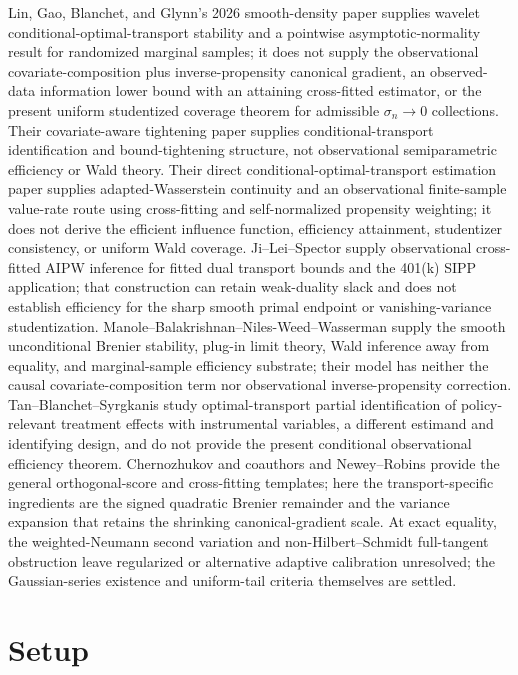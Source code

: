 \documentclass{article}
\begin{document}
Lin, Gao, Blanchet, and Glynn's 2026 smooth-density paper supplies wavelet conditional-optimal-transport stability and a pointwise asymptotic-normality result for randomized marginal samples; it does not supply the observational covariate-composition plus inverse-propensity canonical gradient, an observed-data information lower bound with an attaining cross-fitted estimator, or the present uniform studentized coverage theorem for admissible \(\sigma_n\to0\) collections. Their covariate-aware tightening paper supplies conditional-transport identification and bound-tightening structure, not observational semiparametric efficiency or Wald theory. Their direct conditional-optimal-transport estimation paper supplies adapted-Wasserstein continuity and an observational finite-sample value-rate route using cross-fitting and self-normalized propensity weighting; it does not derive the efficient influence function, efficiency attainment, studentizer consistency, or uniform Wald coverage. Ji--Lei--Spector supply observational cross-fitted AIPW inference for fitted dual transport bounds and the 401(k) SIPP application; that construction can retain weak-duality slack and does not establish efficiency for the sharp smooth primal endpoint or vanishing-variance studentization. Manole--Balakrishnan--Niles-Weed--Wasserman supply the smooth unconditional Brenier stability, plug-in limit theory, Wald inference away from equality, and marginal-sample efficiency substrate; their model has neither the causal covariate-composition term nor observational inverse-propensity correction. Tan--Blanchet--Syrgkanis study optimal-transport partial identification of policy-relevant treatment effects with instrumental variables, a different estimand and identifying design, and do not provide the present conditional observational efficiency theorem. Chernozhukov and coauthors and Newey--Robins provide the general orthogonal-score and cross-fitting templates; here the transport-specific ingredients are the signed quadratic Brenier remainder and the variance expansion that retains the shrinking canonical-gradient scale. At exact equality, the weighted-Neumann second variation and non-Hilbert--Schmidt full-tangent obstruction leave regularized or alternative adaptive calibration unresolved; the Gaussian-series existence and uniform-tail criteria themselves are settled.

\section{Setup}
\end{document}
